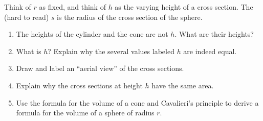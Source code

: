 \documentclass[nooutcomes]{ximera}
\begin{document}
\begin{problem}
\begin{image}
{}
\end{image}
Think of $r$ as fixed, and think of $h$ as the varying height of a cross section.  The (hard to read) $s$ is the radius of the cross section of the sphere.  
\begin{enumerate}
\item The heights of the cylinder and the cone are not $h$.  What are their heights?  
\item What is $h$?  Explain why the several values labeled $h$ are indeed equal.   
\item Draw and label an ``aerial view'' of the cross sections.   
\item Explain why the cross sections at height $h$ have the same area.  
\item Use the formula for the volume of a cone and Cavalieri's principle to derive a formula for the volume of a sphere of radius $r$.  
\end{enumerate}
\vfill
\end{problem}
\end{document}
